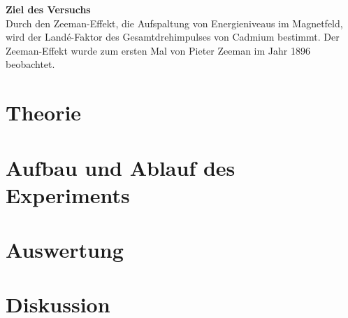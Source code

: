 \documentclass[a4,11pt]{article}
\newcommand{\V}{V27}
\begin{document}



\tableofcontents
\clearpage



\textbf{Ziel des Versuchs} \\
Durch den Zeeman-Effekt, die Aufspaltung von Energieniveaus im Magnetfeld, wird der Landé-Faktor des Gesamtdrehimpulses von Cadmium bestimmt. Der Zeeman-Effekt wurde zum ersten Mal von Pieter Zeeman im Jahr 1896 beobachtet.


\section{Theorie}

\clearpage


\section{Aufbau und Ablauf des Experiments}

\clearpage


\section{Auswertung}

\clearpage


\section{Diskussion}


\clearpage
\listoftodos
\listoffigures
\listoftables
\clearpage
\nocite{\V}
\printbibliography[title = Literaturverzeichnis]
\end{document}
